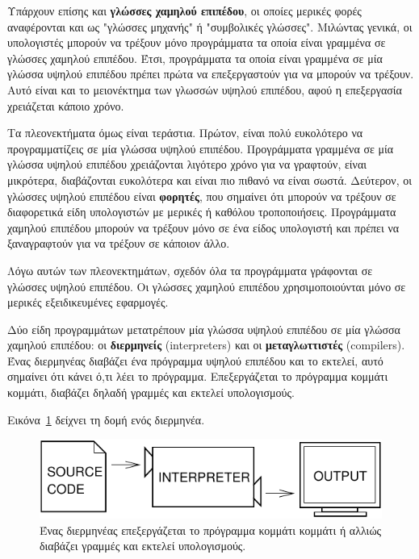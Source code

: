 \documentclass[10pt]{book}
\begin{document}
Υπάρχουν επίσης και {\bf γλώσσες χαμηλού επιπέδου}, οι οποίες μερικές φορές
αναφέρονται και ως "γλώσσες μηχανής" ή "συμβολικές γλώσσες".  Μιλώντας γενικά, οι υπολογιστές μπορούν να τρέξουν μόνο προγράμματα τα οποία είναι γραμμένα σε γλώσσες χαμηλού επιπέδου. Έτσι, προγράμματα τα οποία είναι γραμμένα σε μία γλώσσα υψηλού επιπέδου πρέπει πρώτα να επεξεργαστούν για να μπορούν να τρέξουν.  Αυτό είναι και το μειονέκτημα των γλωσσών υψηλού επιπέδου, αφού η
επεξεργασία χρειάζεται κάποιο χρόνο.


Τα πλεονεκτήματα όμως είναι τεράστια. Πρώτον, είναι πολύ ευκολότερο
να προγραμματίζεις σε μία γλώσσα υψηλού επιπέδου. Προγράμματα γραμμένα
σε μία γλώσσα υψηλού επιπέδου χρειάζονται λιγότερο χρόνο για να γραφτούν,
είναι μικρότερα, διαβάζονται ευκολότερα και είναι πιο πιθανό να είναι
σωστά. Δεύτερον, οι γλώσσες υψηλού επιπέδου είναι {\bf φορητές}, που σημαίνει
ότι μπορούν να τρέξουν σε διαφορετικά είδη υπολογιστών με μερικές ή καθόλου
τροποποιήσεις. Προγράμματα χαμηλού επιπέδου μπορούν να τρέξουν μόνο σε ένα είδος υπολογιστή και πρέπει να ξαναγραφτούν για να τρέξουν σε κάποιον άλλο.

Λόγω αυτών των πλεονεκτημάτων, σχεδόν όλα τα προγράμματα γράφονται σε
γλώσσες υψηλού επιπέδου. Οι γλώσσες χαμηλού επιπέδου χρησιμοποιούνται μόνο
σε μερικές εξειδικευμένες εφαρμογές.


Δύο είδη προγραμμάτων μετατρέπουν μία γλώσσα υψηλού επιπέδου σε μία
γλώσσα χαμηλού επιπέδου: οι {\bf διερμηνείς} (interpreters) και οι {\bf μεταγλωττιστές} (compilers). Ένας διερμηνέας διαβάζει ένα πρόγραμμα υψηλού επιπέδου και το εκτελεί, αυτό σημαίνει ότι κάνει ό,τι λέει το πρόγραμμα.  Επεξεργάζεται το πρόγραμμα κομμάτι κομμάτι, διαβάζει δηλαδή γραμμές και εκτελεί υπολογισμούς.

Εικόνα~\ref{fig.interpret} δείχνει τη δομή ενός διερμηνέα.

\begin{figure}
\centerline
{\includegraphics[scale=0.9]{figs/interpret.pdf}}
\caption{Ένας διερμηνέας επεξεργάζεται το πρόγραμμα
κομμάτι κομμάτι ή αλλιώς διαβάζει γραμμές και εκτελεί υπολογισμούς.}
\label{fig.interpret}
\end{figure}
\end{document}
